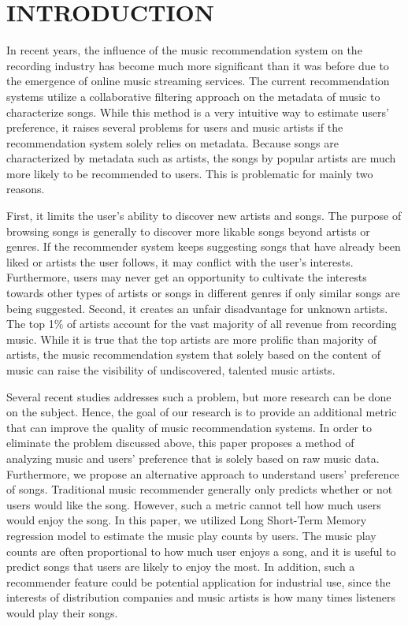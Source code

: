 \section{INTRODUCTION}
In recent years, the influence of the music recommendation system on the recording industry has become much more significant than it was before due to the emergence of online music streaming services. The current recommendation systems utilize a collaborative filtering approach on the metadata of music to characterize songs. While this method is a very intuitive way to estimate users' preference, it raises several problems for users and music artists if the recommendation system solely relies on metadata. Because songs are characterized by metadata such as artists, the songs by popular artists are much more likely to be recommended to users. This is problematic for mainly two reasons. 

First, it limits the user's ability to discover new artists and songs. The purpose of browsing songs is generally to discover more likable songs beyond artists or genres. If the recommender system keeps suggesting songs that have already been liked or artists the user follows, it may conflict with the user's interests. Furthermore, users may never get an opportunity to cultivate the interests towards other types of artists or songs in different genres if only similar songs are being suggested. Second, it creates an unfair disadvantage for unknown artists. The top 1\% of artists account for the vast majority of all revenue from recording music. \cite{top-artist-site} While it is true that the top artists are more prolific than majority of artists, the music recommendation system that solely based on the content of music can raise the visibility of undiscovered, talented music artists.

Several recent studies addresses such a problem, but more research can be done on the subject. Hence, the goal of our research is to provide an additional metric that can improve the quality of music recommendation systems. In order to eliminate the problem discussed above, this paper proposes a method of analyzing music and users' preference that is solely based on raw music data. Furthermore, we propose an alternative approach to understand users' preference of songs. Traditional music recommender generally only predicts whether or not users would like the song. However, such a metric cannot tell how much users would enjoy the song. In this paper, we utilized Long Short-Term Memory regression model to estimate the music play counts by users. The music play counts are often proportional to how much user enjoys a song, and it is useful to predict songs that users are likely to enjoy the most. In addition, such a recommender feature could be potential application for industrial use, since the interests of distribution companies and music artists is how many times listeners would play their songs.
